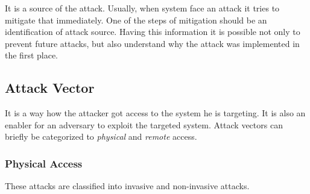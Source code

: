 It is a source of the attack. Usually, when system face an attack it tries to mitigate that immediately. One of the steps of mitigation should be an identification of attack source. Having this information it is possible not only to prevent future attacks, but also understand why the attack was implemented in the first place.
	
\subsection{Attack Vector}
It is a way how the attacker got access to the system he is targeting. It is also an enabler for an adversary to exploit the targeted system. Attack vectors can briefly be categorized to \textit{physical} and \textit{remote} access.

\subsubsection{Physical Access}
These attacks are classified into invasive and non-invasive attacks.

